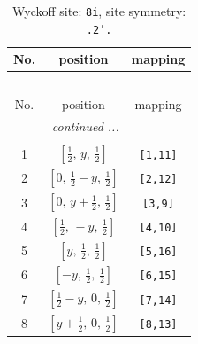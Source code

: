 \documentclass[fleqn,8pt]{jsarticle}
\begin{document}
\renewcommand{\arraystretch}{1.2}
\begin{longtable}{ccc}
\caption{Wyckoff site: {\tt 8i}, site symmetry: {\tt .2'.}}
 \\
 \hline \hline
No. & position & mapping \\ \hline \endfirsthead

\multicolumn{2}{l}{\tablename\ \thetable{}} \\
 \hline \hline
No. & position & mapping \\ \hline \endhead

 \hline \hline
\multicolumn{2}{r}{\footnotesize\it continued ...} \\ \endfoot

 \hline \hline
\multicolumn{2}{r}{} \\ \endlastfoot

1 & $\left[ \frac{1}{2},\, y,\, \frac{1}{2} \right]$ & {\tt [1,11]} \\ \hline
2 & $\left[ 0,\, \frac{1}{2} - y,\, \frac{1}{2} \right]$ & {\tt [2,12]} \\ \hline
3 & $\left[ 0,\, y + \frac{1}{2},\, \frac{1}{2} \right]$ & {\tt [3,9]} \\ \hline
4 & $\left[ \frac{1}{2},\, - y,\, \frac{1}{2} \right]$ & {\tt [4,10]} \\ \hline
5 & $\left[ y,\, \frac{1}{2},\, \frac{1}{2} \right]$ & {\tt [5,16]} \\ \hline
6 & $\left[ - y,\, \frac{1}{2},\, \frac{1}{2} \right]$ & {\tt [6,15]} \\ \hline
7 & $\left[ \frac{1}{2} - y,\, 0,\, \frac{1}{2} \right]$ & {\tt [7,14]} \\ \hline
8 & $\left[ y + \frac{1}{2},\, 0,\, \frac{1}{2} \right]$ & {\tt [8,13]} \\
\end{longtable}
\renewcommand{\arraystretch}{1.2}
\end{document}
